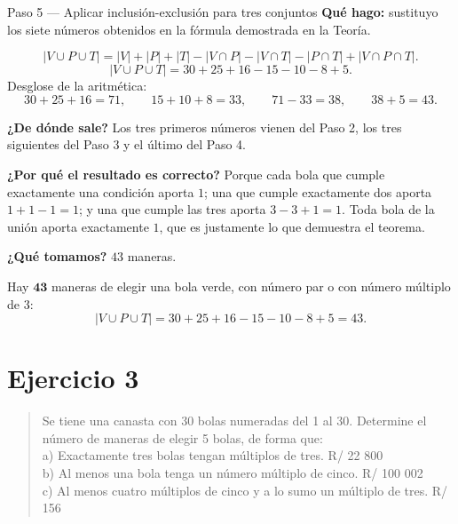 \documentclass[11pt]{article}
\begin{document}
\begin{paso}{Paso 5 --- Aplicar inclusión-exclusión para tres conjuntos}
\textbf{Qué hago:} sustituyo los siete números obtenidos en la fórmula demostrada en la Teoría.

\[
|V\cup P\cup T| = |V|+|P|+|T| - |V\cap P| - |V\cap T| - |P\cap T| + |V\cap P\cap T| .
\]
\[
|V\cup P\cup T| = 30+25+16 - 15 - 10 - 8 + 5 .
\]
Desglose de la aritmética:
\[
30+25+16 = 71,\qquad 15+10+8 = 33,\qquad 71-33 = 38,\qquad 38+5 = 43 .
\]

\textbf{¿De dónde sale?} Los tres primeros números vienen del Paso 2, los tres siguientes del Paso 3 y el último del Paso 4.

\textbf{¿Por qué el resultado es correcto?} Porque cada bola que cumple exactamente una condición aporta $1$; una que cumple exactamente dos aporta $1+1-1=1$; y una que cumple las tres aporta $3-3+1=1$. Toda bola de la unión aporta exactamente $1$, que es justamente lo que demuestra el teorema.

\textbf{¿Qué tomamos?} $43$ maneras.
\end{paso}

\begin{resp}
Hay $\mathbf{43}$ maneras de elegir una bola verde, con número par o con número múltiplo de $3$:
\[
|V\cup P\cup T| = 30+25+16-15-10-8+5 = 43 .
\]
\end{resp}

\section*{Ejercicio 3}

\begin{quote}
Se tiene una canasta con 30 bolas numeradas del 1 al 30. Determine el número de maneras de elegir 5 bolas, de forma que:\\
a) Exactamente tres bolas tengan múltiplos de tres. \hfill R/ 22 800\\
b) Al menos una bola tenga un número múltiplo de cinco. \hfill R/ 100 002\\
c) Al menos cuatro múltiplos de cinco y a lo sumo un múltiplo de tres. \hfill R/ 156
\end{quote}
\end{document}

